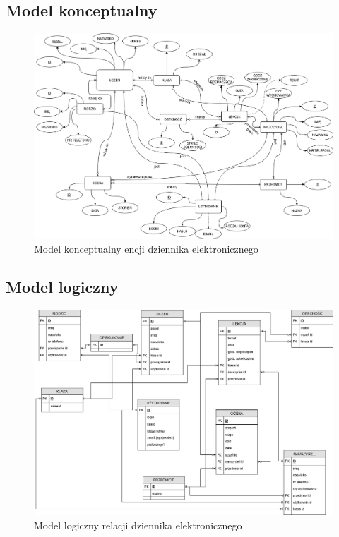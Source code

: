 \documentclass[12pt]{article}
\begin{document}
\begin{landscape}
\subsection{Model konceptualny}

\begin{figure}[h!]
    \centering
    \includegraphics[scale=0.47]{MKonceptualny.png}
    \caption{Model konceptualny encji dziennika elektronicznego}
    \label{fig:mk}
\end{figure}

\newpage
\subsection{Model logiczny}

\begin{figure}[h!]
    \centering
    \includegraphics[scale=0.47]{MLogiczny.png}
    \caption{Model logiczny relacji dziennika elektronicznego}
    \label{fig:ml}
\end{figure}


\end{landscape}
\end{document}
